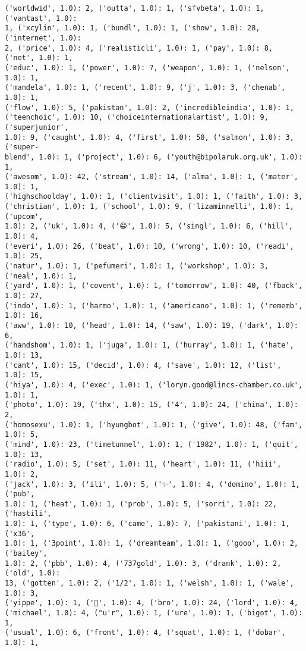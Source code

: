 \documentclass[11pt]{article}
\begin{document}
\begin{Verbatim}[commandchars=\\\{\}]
('worldwid', 1.0): 2, ('outta', 1.0): 1, ('sfvbeta', 1.0): 1, ('vantast', 1.0):
1, ('xcylin', 1.0): 1, ('bundl', 1.0): 1, ('show', 1.0): 28, ('internet', 1.0):
2, ('price', 1.0): 4, ('realisticli', 1.0): 1, ('pay', 1.0): 8, ('net', 1.0): 1,
('educ', 1.0): 1, ('power', 1.0): 7, ('weapon', 1.0): 1, ('nelson', 1.0): 1,
('mandela', 1.0): 1, ('recent', 1.0): 9, ('j', 1.0): 3, ('chenab', 1.0): 1,
('flow', 1.0): 5, ('pakistan', 1.0): 2, ('incredibleindia', 1.0): 1,
('teenchoic', 1.0): 10, ('choiceinternationalartist', 1.0): 9, ('superjunior',
1.0): 9, ('caught', 1.0): 4, ('first', 1.0): 50, ('salmon', 1.0): 3, ('super-
blend', 1.0): 1, ('project', 1.0): 6, ('youth@bipolaruk.org.uk', 1.0): 1,
('awesom', 1.0): 42, ('stream', 1.0): 14, ('alma', 1.0): 1, ('mater', 1.0): 1,
('highschoolday', 1.0): 1, ('clientvisit', 1.0): 1, ('faith', 1.0): 3,
('christian', 1.0): 1, ('school', 1.0): 9, ('lizaminnelli', 1.0): 1, ('upcom',
1.0): 2, ('uk', 1.0): 4, ('😄', 1.0): 5, ('singl', 1.0): 6, ('hill', 1.0): 4,
('everi', 1.0): 26, ('beat', 1.0): 10, ('wrong', 1.0): 10, ('readi', 1.0): 25,
('natur', 1.0): 1, ('pefumeri', 1.0): 1, ('workshop', 1.0): 3, ('neal', 1.0): 1,
('yard', 1.0): 1, ('covent', 1.0): 1, ('tomorrow', 1.0): 40, ('fback', 1.0): 27,
('indo', 1.0): 1, ('harmo', 1.0): 1, ('americano', 1.0): 1, ('rememb', 1.0): 16,
('aww', 1.0): 10, ('head', 1.0): 14, ('saw', 1.0): 19, ('dark', 1.0): 6,
('handshom', 1.0): 1, ('juga', 1.0): 1, ('hurray', 1.0): 1, ('hate', 1.0): 13,
('cant', 1.0): 15, ('decid', 1.0): 4, ('save', 1.0): 12, ('list', 1.0): 15,
('hiya', 1.0): 4, ('exec', 1.0): 1, ('loryn.good@lincs-chamber.co.uk', 1.0): 1,
('photo', 1.0): 19, ('thx', 1.0): 15, ('4', 1.0): 24, ('china', 1.0): 2,
('homosexu', 1.0): 1, ('hyungbot', 1.0): 1, ('give', 1.0): 48, ('fam', 1.0): 5,
('mind', 1.0): 23, ('timetunnel', 1.0): 1, ('1982', 1.0): 1, ('quit', 1.0): 13,
('radio', 1.0): 5, ('set', 1.0): 11, ('heart', 1.0): 11, ('hiii', 1.0): 2,
('jack', 1.0): 3, ('ili', 1.0): 5, ('✨', 1.0): 4, ('domino', 1.0): 1, ('pub',
1.0): 1, ('heat', 1.0): 1, ('prob', 1.0): 5, ('sorri', 1.0): 22, ('hastili',
1.0): 1, ('type', 1.0): 6, ('came', 1.0): 7, ('pakistani', 1.0): 1, ('x36',
1.0): 1, ('3point', 1.0): 1, ('dreamteam', 1.0): 1, ('gooo', 1.0): 2, ('bailey',
1.0): 2, ('pbb', 1.0): 4, ('737gold', 1.0): 3, ('drank', 1.0): 2, ('old', 1.0):
13, ('gotten', 1.0): 2, ('1/2', 1.0): 1, ('welsh', 1.0): 1, ('wale', 1.0): 3,
('yippe', 1.0): 1, ('💟', 1.0): 4, ('bro', 1.0): 24, ('lord', 1.0): 4,
('michael', 1.0): 4, ("u'r", 1.0): 1, ('ure', 1.0): 1, ('bigot', 1.0): 1,
('usual', 1.0): 6, ('front', 1.0): 4, ('squat', 1.0): 1, ('dobar', 1.0): 1,

\end{Verbatim}
\end{document}
